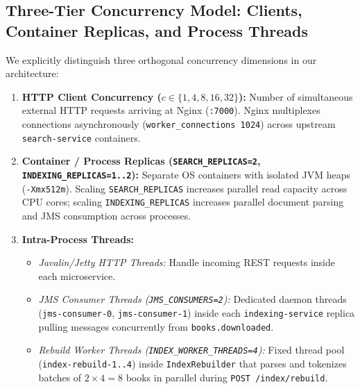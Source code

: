 \documentclass[10pt,a4paper]{article}
\begin{document}
\subsection{Three-Tier Concurrency Model: Clients, Container Replicas, and Process Threads}
We explicitly distinguish three orthogonal concurrency dimensions in our architecture:
\begin{enumerate}[leftmargin=*,nosep]
    \item \textbf{HTTP Client Concurrency ($c \in \{1, 4, 8, 16, 32\}$):} Number of simultaneous external HTTP requests arriving at Nginx (\texttt{:7000}). Nginx multiplexes connections asynchronously (\texttt{worker\_connections 1024}) across upstream \texttt{search-service} containers.
    \item \textbf{Container / Process Replicas (\texttt{SEARCH\_REPLICAS=2}, \texttt{INDEXING\_REPLICAS=1..2}):} Separate OS containers with isolated JVM heaps (\texttt{-Xmx512m}). Scaling \texttt{SEARCH\_REPLICAS} increases parallel read capacity across CPU cores; scaling \texttt{INDEXING\_REPLICAS} increases parallel document parsing and JMS consumption across processes.
    \item \textbf{Intra-Process Threads:}
    \begin{itemize}[nosep]
        \item \emph{Javalin/Jetty HTTP Threads:} Handle incoming REST requests inside each microservice.
        \item \emph{JMS Consumer Threads (\texttt{JMS\_CONSUMERS=2}):} Dedicated daemon threads (\texttt{jms-consumer-0}, \texttt{jms-consumer-1}) inside each \texttt{indexing-service} replica pulling messages concurrently from \texttt{books.downloaded}.
        \item \emph{Rebuild Worker Threads (\texttt{INDEX\_WORKER\_THREADS=4}):} Fixed thread pool (\texttt{index-rebuild-1..4}) inside \texttt{IndexRebuilder} that parses and tokenizes batches of $2 \times 4 = 8$ books in parallel during \texttt{POST /index/rebuild}.
    \end{itemize}
\end{enumerate}
\end{document}
